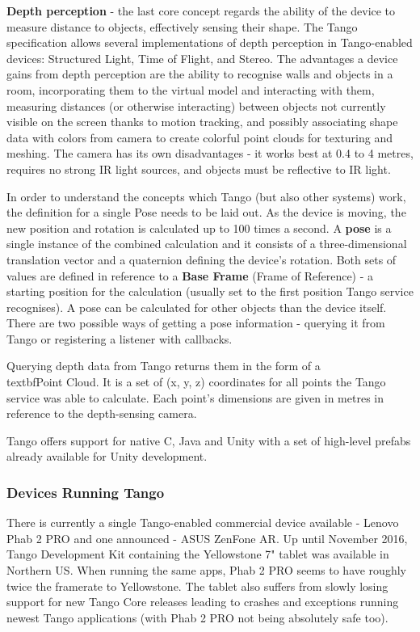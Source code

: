 \documentclass[12pt, a4paper]{article}
\begin{document}
\textbf{Depth perception} - the last core concept regards the ability of the device to measure distance to objects, effectively sensing their shape. The Tango specification allows several implementations of depth perception in Tango-enabled devices: Structured Light, Time of Flight, and Stereo. The advantages a device gains from depth perception are the ability to recognise walls and objects in a room, incorporating them to the virtual model and interacting with them, measuring distances (or otherwise interacting) between objects not currently visible on the screen thanks to motion tracking, and possibly associating shape data with colors from camera to create colorful point clouds for texturing and meshing. The camera has its own disadvantages - it works best at 0.4 to 4 metres, requires no strong IR light sources, and objects must be reflective to IR light.

In order to understand the concepts which Tango (but also other systems) work, the definition for a single Pose needs to be laid out. As the device is moving, the new position and rotation is calculated up to 100 times a second. A \textbf{pose} is a single instance of the combined calculation and it consists of a three-dimensional translation vector and a quaternion defining the device’s rotation. Both sets of values are defined in reference to a \textbf{Base Frame} (Frame of Reference) - a starting position for the calculation (usually set to the first position Tango service recognises). A pose can be calculated for other objects than the device itself. There are two possible ways of getting a pose information - querying it from Tango or registering a listener with callbacks.

Querying depth data from Tango returns them in the form of a \\textbf{Point Cloud}. It is a set of (x, y, z) coordinates for all points the Tango service was able to calculate. Each point’s dimensions are given in metres in reference to the depth-sensing camera.

Tango offers support for native C, Java and Unity with a set of high-level prefabs already available for Unity development.

\subsubsection{Devices Running Tango}
There is currently a single Tango-enabled commercial device available - Lenovo Phab 2 PRO and one announced - ASUS ZenFone AR. Up until November 2016, Tango Development Kit containing the Yellowstone 7" tablet was available in Northern US. When running the same apps, Phab 2 PRO seems to have roughly twice the framerate to Yellowstone. The tablet also suffers from slowly losing support for new Tango Core releases leading to crashes and exceptions running newest Tango applications (with Phab 2 PRO not being absolutely safe too).
\end{document}
